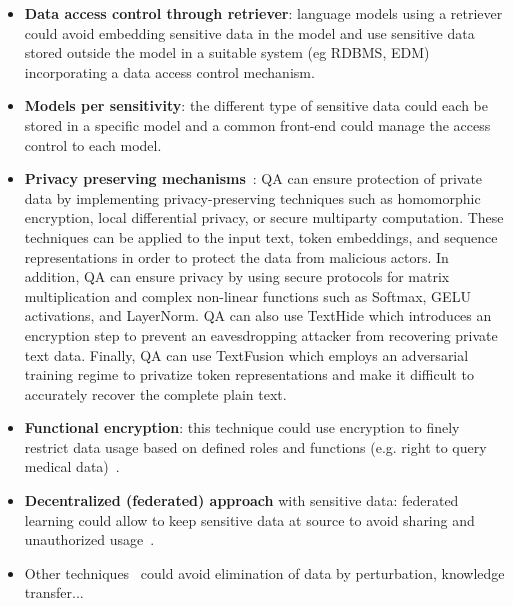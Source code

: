 \documentclass[acmsmall]{acmart}
\begin{document}
\begin{itemize}
    \item \textbf{Data access control through retriever}: language models using a retriever could avoid embedding sensitive data in the model and use sensitive data stored outside the model in a suitable system (eg RDBMS, EDM) incorporating a data access control mechanism.
    \item \textbf{Models per sensitivity}: the different type of sensitive data could each be stored in a specific model and a common front-end could manage the access control to each model.
    \item \textbf{Privacy preserving mechanisms}~\citep{chenTHEXPrivacyPreservingTransformer2022, haoIronPrivateInference2022, huangTextHideTacklingData2020, kimPrivacypreservingTextEmbedding2022, mireshghallahQuantifyingPrivacyRisks2022, quNaturalLanguageUnderstanding2021, quPrivacyAdaptiveBERTNatural2021, zhouTextFusionPrivacyPreservingPretrained2022, xuPrivacyPreservingMachineLearning2021}: QA can ensure protection of private data by implementing privacy-preserving techniques such as homomorphic encryption, local differential privacy, or secure multiparty computation. These techniques can be applied to the input text, token embeddings, and sequence representations in order to protect the data from malicious actors. In addition, QA can ensure privacy by using secure protocols for matrix multiplication and complex non-linear functions such as Softmax, GELU activations, and LayerNorm. QA can also use TextHide which introduces an encryption step to prevent an eavesdropping attacker from recovering private text data. Finally, QA can use TextFusion which employs an adversarial training regime to privatize token representations and make it difficult to accurately recover the complete plain text.
    \item \textbf{Functional encryption}: this technique could use encryption to finely restrict data usage based on defined roles and functions (e.g. right to query medical data)~\citep{xuPrivacyPreservingMachineLearning2021}.
    \item \textbf{Decentralized (federated) approach} with sensitive data: federated learning could allow to keep sensitive data at source to avoid sharing and unauthorized usage~\citep{chenFedMatchFederatedLearning2021, xuPrivacyPreservingMachineLearning2021, xiaoOffsiteTuningTransferLearning2023}.
    \item Other techniques~\citep{xuPrivacyPreservingMachineLearning2021} could avoid elimination of data by perturbation, knowledge transfer...
\end{itemize}
\end{document}
